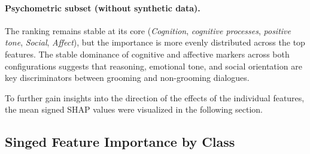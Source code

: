 \paragraph{Psychometric subset (without synthetic data).}
The ranking remains stable at its core (\textit{Cognition}, \textit{cognitive processes}, \textit{positive tone}, \textit{Social},  \textit{Affect}), but the importance is more evenly distributed across the top features. The stable dominance of cognitive and affective markers across both configurations suggests that reasoning, emotional tone, and social orientation are key discriminators between grooming and non-grooming dialogues.

To further gain insights into the direction of the effects of the individual features, the mean signed SHAP values were visualized in the following section.


\subsection{Singed Feature Importance by Class}

